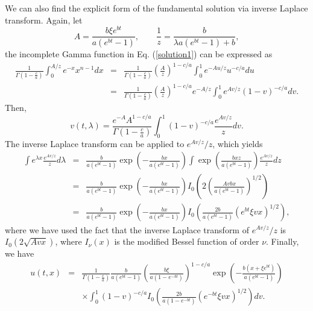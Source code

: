 \documentclass[12pt]{article}
\begin{document}
    We can also find the explicit form of the fundamental solution via inverse Laplace transform. Again, let
    \begin{equation}
      \label{sub}
      A = \frac{b\xi e^{bt}}{a(e^{bt}-1)}, \quad\quad \frac{1}{z} = \frac{b}{\lambda a(e^{bt}-1)+b},
    \end{equation}
    the incomplete Gamma function in Eq. (\ref{solution1}) can be expressed as
    \begin{eqnarray}
      \frac{1}{\displaystyle \Gamma\left(1-\frac{c}{a}\right)}\int_0^{A/z}e^{-x}x^{n-1}dx
      &=& \frac{1}{\displaystyle \Gamma\left(1-\frac{c}{a}\right)}\left(\frac{A}{z}\right)^{1-c/a}\int_0^1 e^{-Au/z}u^{-c/a}du \nonumber\\
      &=& \frac{1}{\displaystyle \Gamma\left(1-\frac{c}{a}\right)}\left(\frac{A}{z}\right)^{1-c/a}e^{-A/z}\int_0^1 e^{Av/z}(1-v)^{-c/a}dv.
    \end{eqnarray}
    Then,
    \begin{equation}
      v(t,\lambda) = \frac{e^{-A}A^{1-c/a}}{\displaystyle \Gamma\left(1-\frac{c}{a}\right)}\int_0^1 (1-v)^{-c/a}\frac{e^{Av/z}}{z}dv.
    \end{equation}
    The inverse Laplace transform can be applied to $e^{Av/z}/z$, which yields
    \begin{eqnarray}
      \int e^{\lambda x}\frac{e^{Av/z}}{z}d\lambda &=& \frac{b}{a(e^{bt}-1)}\exp\left(-\frac{bx}{a(e^{bt}-1)}\right)
                                                          \int \exp\left(\frac{bxz}{a(e^{bt}-1)}\right)\frac{e^{Av/z}}{z}dz \nonumber\\
                                                   &=& \frac{b}{a(e^{bt}-1)}\exp\left(-\frac{bx}{a(e^{bt}-1)}\right)I_0\left(2\left(\frac{Avbx}{a(e^{bt}-1)}\right)^{1/2}\right) \nonumber\\
                                                   &=& \frac{b}{a(e^{bt}-1)}\exp\left(-\frac{bx}{a(e^{bt}-1)}\right)I_0\left(\frac{2b}{a(e^{bt}-1)}\left(e^{bt}\xi v x\right)^{1/2}\right),
    \end{eqnarray}
    where we have used the fact that the inverse Laplace transform of $e^{Av/z}/z$ is $I_0(2\sqrt{Avx})$, where $I_{\nu}(x)$ is the modified Bessel
    function of order $\nu$. Finally, we have
    \begin{eqnarray}
      \label{solution4}
      u(t,x) &=& \frac{1}{\displaystyle \Gamma\left(1-\frac{c}{a}\right)}\frac{b}{a(e^{bt}-1)}\left(\frac{b\xi}{a(1-e^{-bt})}\right)^{1-c/a}
                 \exp\left(-\frac{b(x+\xi e^{bt})}{a(e^{bt}-1)}\right) \nonumber\\
              && \times\int_0^1(1-v)^{-c/a}I_0\left(\frac{2b}{a(1-e^{-bt})}\left(e^{-bt}\xi v x\right)^{1/2}\right)dv.
    \end{eqnarray}
\end{document}

